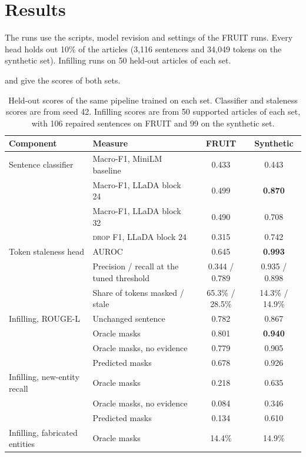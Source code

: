 \documentclass[]{paper}
\newcommand{\drop}{\textsc{drop}}
\begin{document}
\section{Results}
\label{sec:results}

The runs use the scripts, model revision and settings of the FRUIT runs. Every head holds out 10\% of the articles (3,116 sentences and 34,049 tokens on the synthetic set). Infilling runs on 50 held-out articles of each set.

 and  give the scores of both sets.

\begin{table}[H]
\caption{Held-out scores of the same pipeline trained on each set. Classifier and staleness scores are from seed 42. Infilling scores are from 50 supported articles of each set, with 106 repaired sentences on FRUIT and 99 on the synthetic set.}
\label{tab:results}
\centering
\footnotesize
\begin{tabular}{llcc}
\toprule
Component & Measure & FRUIT & Synthetic \\
\midrule
Sentence classifier & Macro-F1, MiniLM baseline & 0.433 & 0.443 \\
 & Macro-F1, LLaDA block 24 & 0.499 & \textbf{0.870} \\
 & Macro-F1, LLaDA block 32 & 0.490 & 0.708 \\
 & \drop{} F1, LLaDA block 24 & 0.315 & 0.742 \\
\midrule
Token staleness head & AUROC & 0.645 & \textbf{0.993} \\
 & Precision / recall at the tuned threshold & 0.344 / 0.789 & 0.935 / 0.898 \\
 & Share of tokens masked / stale & 65.3\% / 28.5\% & 14.3\% / 14.9\% \\
\midrule
Infilling, ROUGE-L & Unchanged sentence & 0.782 & 0.867 \\
 & Oracle masks & 0.801 & \textbf{0.940} \\
 & Oracle masks, no evidence & 0.779 & 0.905 \\
 & Predicted masks & 0.678 & 0.926 \\
Infilling, new-entity recall & Oracle masks & 0.218 & 0.635 \\
 & Oracle masks, no evidence & 0.084 & 0.346 \\
 & Predicted masks & 0.134 & 0.610 \\
Infilling, fabricated entities & Oracle masks & 14.4\% & 14.9\% \\
\bottomrule
\end{tabular}
\end{table}
\end{document}
